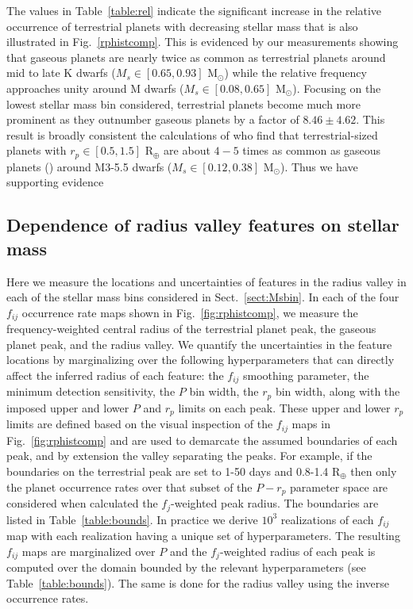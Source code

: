 \documentclass[twocolumn]{emulateapj}
\begin{document}


The values in Table~\ref{table:rel} indicate the significant increase in the relative occurrence of terrestrial
planets with decreasing stellar mass that is also illustrated in Fig.~\ref{rphistcomp}. This is evidenced by
our measurements showing that gaseous planets are nearly twice as common as terrestrial planets
around mid to late K dwarfs ($M_s \in [0.65,0.93]$ M$_{\odot}$) while the relative frequency approaches unity
around M dwarfs ($M_s \in [0.08,0.65]$ M$_{\odot}$). Focusing on the lowest stellar mass bin considered,
terrestrial planets become much more prominent as they outnumber gaseous planets by a factor of
$8.46\pm 4.62$. This result is broadly
consistent the calculations of \cite{hardegree19} who find that terrestrial-sized 
planets with $r_p \in[0.5,1.5]$ R$_{\oplus}$ are about $4-5$ times as common as gaseous planets ()
around M3-5.5 dwarfs ($M_s \in [0.12,0.38]$ M$_{\odot}$). Thus we have supporting evidence 

\subsection{Dependence of radius valley features on stellar mass}
Here we measure the locations and uncertainties of features in the radius valley in each of the stellar
mass bins considered in Sect.~\ref{sect:Msbin}. In each of the four $f_{ij}$ occurrence rate maps shown
in Fig.~\ref{fig:rphistcomp}, we measure the frequency-weighted central radius of the terrestrial planet peak,
the gaseous planet peak, and the radius valley. We quantify the uncertainties in the feature locations by
marginalizing over the following hyperparameters that can directly affect the inferred radius of each feature:
the $f_{ij}$ smoothing parameter, the minimum detection sensitivity,
the $P$ bin width, the $r_p$ bin width, along with the imposed upper and
lower $P$ and $r_p$ limits on each peak. These upper and lower $r_p$ limits are defined based on the visual
inspection of the $f_{ij}$ maps in Fig.~\ref{fig:rphistcomp} and are used to demarcate the assumed
boundaries of each peak, and by extension the valley separating the peaks.
For example, if the boundaries on the terrestrial peak are set to 1-50 days and 0.8-1.4 R$_{\oplus}$ then only
the planet occurrence rates over that subset of the $P-r_p$ parameter space are considered when calculated the
$f_j$-weighted peak radius. The boundaries are listed in Table~\ref{table:bounds}.
In practice we derive $10^3$ realizations of each $f_{ij}$ map with each realization having a unique set of
hyperparameters. The resulting $f_{ij}$ maps are marginalized over $P$ and the $f_j$-weighted radius of
each peak is computed over the domain bounded by the relevant hyperparameters (see Table~\ref{table:bounds}).
The same is done for the radius valley using the inverse occurrence rates.
\end{document}
